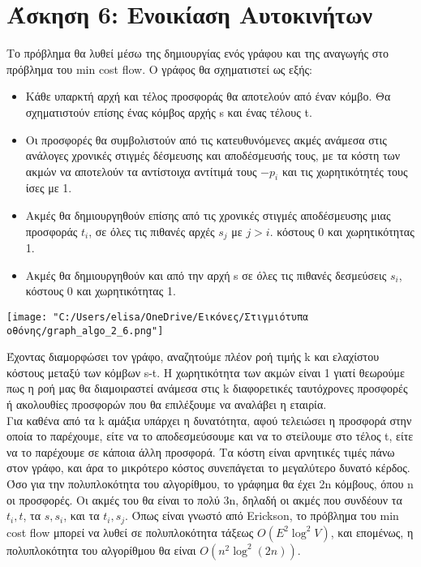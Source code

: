 \documentclass{article}
\begin{document}
\section*{\large Άσκηση 6: Ενοικίαση Αυτοκινήτων}
Το πρόβλημα θα λυθεί μέσω της δημιουργίας ενός γράφου και της αναγωγής στο πρόβλημα του min cost flow. Ο γράφος θα σχηματιστεί ως εξής:
\begin{itemize}
\item Κάθε υπαρκτή αρχή και τέλος προσφοράς θα αποτελούν από έναν κόμβο. Θα σχηματιστούν επίσης ένας κόμβος αρχής s και ένας τέλους t. 
\item Οι προσφορές θα συμβολιστούν από τις κατευθυνόμενες ακμές ανάμεσα στις ανάλογες χρονικές στιγμές δέσμευσης και αποδέσμευσής τους, με τα κόστη των ακμών να αποτελούν τα αντίστοιχα αντίτιμά τους $-p_i$ και τις χωρητικότητές τους ίσες με 1. 
\item Ακμές θα δημιουργηθούν επίσης από τις χρονικές στιγμές αποδέσμευσης μιας προσφοράς $t_i$, σε όλες τις πιθανές αρχές $s_j$ με $j > i$. κόστους 0 και  χωρητικότητας 1.
\item Ακμές θα δημιουργηθούν και από την αρχή s σε όλες τις πιθανές δεσμεύσεις $s_i$, κόστους 0 και χωρητικότητας 1. 
\end{itemize}

\begin{minipage}{\textwidth}
 \centering
 \texttt{[image: "C:/Users/elisa/OneDrive/Εικόνες/Στιγμιότυπα οθόνης/graph\_algo\_2\_6.png"]}
\end{minipage}

Έχοντας διαμορφώσει τον γράφο, αναζητούμε πλέον ροή τιμής k και ελαχίστου κόστους μεταξύ των κόμβων s-t. Η χωρητικότητα των ακμών είναι 1 γιατί θεωρούμε πως η ροή μας θα διαμοιραστεί ανάμεσα στις k διαφορετικές ταυτόχρονες προσφορές ή ακολουθίες προσφορών που θα επιλέξουμε να αναλάβει η εταιρία.  
\\
Για καθένα από τα k αμάξια υπάρχει η δυνατότητα, αφού τελειώσει η προσφορά στην οποία το παρέχουμε, είτε να το αποδεσμεύσουμε και να το στείλουμε στο τέλος t, είτε να το παρέχουμε σε κάποια άλλη προσφορά. Τα κόστη είναι αρνητικές τιμές πάνω στον γράφο, και άρα το μικρότερο κόστος συνεπάγεται το μεγαλύτερο δυνατό κέρδος. 
\\
Όσο για την πολυπλοκότητα του αλγορίθμου, το γράφημα θα έχει 2n κόμβους, όπου n οι προσφορές. Οι ακμές του θα είναι το πολύ 3n, δηλαδή οι ακμές που συνδέουν τα $t_i, t$, τα $s, s_i$, και τα $t_i, s_j$. Όπως είναι γνωστό από Erickson, το πρόβλημα του min cost flow μπορεί να λυθεί σε πολυπλοκότητα τάξεως $O(E^2 \log^2 V)$, και επομένως, η πολυπλοκότητα του αλγορίθμου θα είναι $O(n^2 \log^2(2n))$. 
\end{document}

